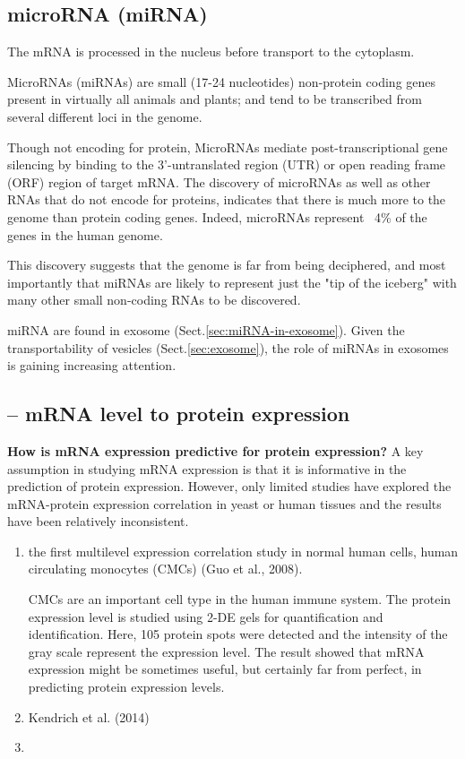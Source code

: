 \subsection{microRNA (miRNA)}
\label{sec:microRNA}
\label{sec:mRNA}

The mRNA is processed in the nucleus before transport to the cytoplasm.

MicroRNAs (miRNAs) are small (17-24 nucleotides) non-protein coding genes
present in virtually all animals and  plants;  and tend to be transcribed from
several different loci in the genome.

Though not encoding for protein, MicroRNAs  mediate post-transcriptional gene
silencing by binding to the 3'-untranslated region (UTR) or open reading frame
(ORF) region of target mRNA. The discovery of microRNAs as well as other RNAs
that do not encode for proteins, indicates that there is much more to the genome
than protein coding genes. Indeed, microRNAs represent ~4\% of the genes in the
human genome.

This discovery suggests that the genome is far from being deciphered, and most
importantly that miRNAs are likely to represent just the "tip of the iceberg"
with many other small non-coding RNAs to be discovered.

miRNA are found in exosome (Sect.\ref{sec:miRNA-in-exosome}).
Given the transportability of vesicles (Sect.\ref{sec:exosome}), the role of
miRNAs in exosomes is gaining increasing attention.

\subsection{-- mRNA level to protein expression}
\label{sec:mRNA-level-2-protein-expression}

{\bf How is mRNA expression predictive for protein expression?} 
A key assumption in studying mRNA expression is that it is informative in the
prediction of protein expression. However, only limited studies have explored
the mRNA-protein expression correlation in yeast or human tissues and the
results have been relatively inconsistent.   

\begin{enumerate}
  \item  the first multilevel expression correlation study in normal human
  cells, human circulating monocytes (CMCs) (Guo et al., 2008).
  
  CMCs are an important cell type in the human immune system.
  The protein expression level is studied using 2-DE gels for quantification and
  identification. Here, 105 protein spots were detected and the intensity of the
  gray scale represent the expression level.
  The result showed that mRNA expression might be sometimes useful, but
  certainly far from perfect, in predicting protein expression levels.
  
  \item Kendrich et al. (2014) 
  
  \item 
\end{enumerate}

